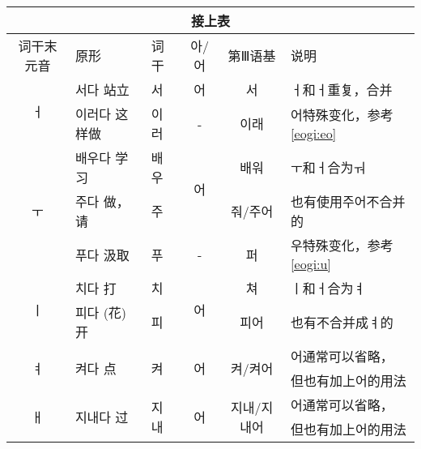 \begin{tabular}{|c|l|l|c|c|l|}
	\hline
	\multicolumn{6}{|c|}{接上表}                                                                                                                \\\hline
	词干末元音              & 原形                     & 词干                  & 아/어                & 第Ⅲ语基                    & 说明                    \\\hline
	\multirow{2}{*}{ㅓ} & 서다 站立                  & 서                   & 어                  & 서                       & ㅓ和ㅓ重复，合并              \\\cline{2-6}
	                   & 이러다 这样做                & 이러                  & -                  & 이래                      & 어特殊变化，参考\ref{eogi:eo} \\\hline
	\multirow{3}{*}{ㅜ} & 배우다 学习                 & 배우                  & \multirow{2}{*}{어} & 배워                      & ㅜ和ㅓ合为ㅝ                \\\cline{2-3}\cline{5-6}
	                   & 주다 做，请                 & 주                   &                    & 줘/주어                    & 也有使用주어不合并的            \\\cline{2-6}
	                   & 푸다 汲取                  & 푸                   & -                  & 퍼                       & 우特殊变化，参考\ref{eogi:u}  \\\hline
	\multirow{2}{*}{ㅣ} & 치다 打                   & 치                   & \multirow{2}{*}{어} & 쳐                       & ㅣ和ㅓ合为ㅕ                \\\cline{2-3}\cline{5-6}
	                   & 피다 (花)开                & 피                   &                    & 피어                      & 也有不合并成ㅕ的              \\\hline
	\multirow{2}{*}{ㅕ} & \multirow{2}{*}{켜다 点}  & \multirow{2}{*}{켜}  & \multirow{2}{*}{어} & \multirow{2}{*}{켜/켜어}   & 어通常可以省略，              \\
	                   &                        &                     &                    &                         & 但也有加上어的用法             \\\hline
	\multirow{2}{*}{ㅐ} & \multirow{2}{*}{지내다 过} & \multirow{2}{*}{지내} & \multirow{2}{*}{어} & \multirow{2}{*}{지내/지내어} & 어通常可以省略，              \\
	                   &                        &                     &                    &                         & 但也有加上어的用法             \\\hline

\end{tabular}
